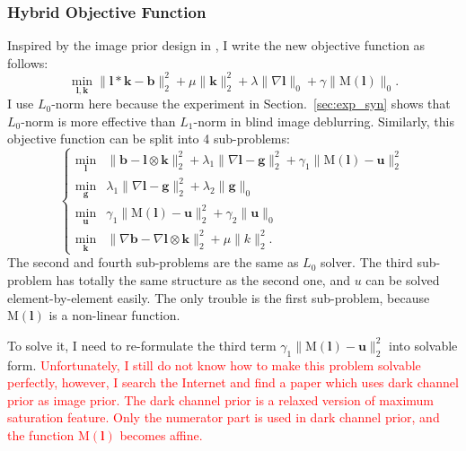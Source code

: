 \documentclass[journal, onecolumn, 10pt]{IEEEtran}
\begin{document}
\subsubsection{Hybrid Objective Function}
Inspired by the image prior design in \cite{pan2014deblurring}, I write the new objective function as follows:
\begin{equation}
\min_{\mathbf{l}, \mathbf{k}} \|\mathbf{l} * \mathbf{k} - \mathbf{b}\|_2^2 + \mu\|\mathbf{k}\|_2^2 +
\lambda\|\nabla \mathbf{l}\|_0 + \gamma \|\text{M}(\mathbf{l})\|_0.
\label{eqn:ms_objective_function}
\end{equation}
I use $L_0$-norm here because the experiment in Section.~\ref{sec:exp_syn} shows that $L_0$-norm is more effective than $L_1$-norm in blind image deblurring. Similarly, this objective function can be split into 4 sub-problems:
\begin{equation}
\begin{cases}
\min_{\mathbf{l}} &\| \mathbf{b} - \mathbf{l} \otimes \mathbf{k} \|_2^2 + \lambda_1 \|\nabla \mathbf{l} - \mathbf{g}\|_2^2 + \gamma_1\|\text{M}(\mathbf{l}) - \mathbf{u}\|_2^2 \\
\min_{\mathbf{g}} &\lambda_1\|\nabla \mathbf{l} - \mathbf{g}\|_2^2 + \lambda_2\|\mathbf{g}\|_{0} \\
\min_{\mathbf{u}} &\gamma_1\|\text{M}(\mathbf{l}) - \mathbf{u}\|_2^2 + \gamma_2\|\mathbf{u}\|_{0} \\
\min_{\mathbf{k}} &\| \nabla\mathbf{b} - \nabla\mathbf{l} \otimes \mathbf{k} \|_2^2 + \mu \|k\|_2^2.
\end{cases}
\label{eqn:ms_objective_function_alter}
\end{equation}
The second and fourth sub-problems are the same as $L_0$ solver. The third sub-problem has totally the same structure as the second one, and $u$ can be solved element-by-element easily. 
The only trouble is the first sub-problem, because $\text{M}(\mathbf{l})$ is a non-linear function. 

To solve it, I need to re-formulate the third term $\gamma_1 \|\text{M}(\mathbf{l}) - \mathbf{u}\|_2^2$ into solvable form. \textcolor{red}{Unfortunately, I still do not know how to make this problem solvable perfectly, however, I search the Internet and find a paper\cite{pan2016blind} which uses dark channel prior as image prior. The dark channel prior is a relaxed version of maximum saturation feature. Only the numerator part is used in dark channel prior, and the function $\text{M}(\mathbf{l})$ becomes affine.}
\end{document}
